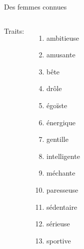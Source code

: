 \begin{frame}{Des femmes connues}
  \begin{columns}
      \scriptsize
      Traits:
      \begin{enumerate}
        \item ambitieuse
        \item amusante
        \item bête
        \item drôle
        \item égoïste
        \item énergique
        \item gentille
        \item intelligente
        \item méchante
        \item paresseuse
        \item sédentaire
        \item sérieuse
        \item sportive
      \end{enumerate}
      \begin{minipage}[c][0.6\textheight]{\linewidth}
        \begin{center}
        \end{center}
      \end{minipage}
  \end{columns}
\end{frame}